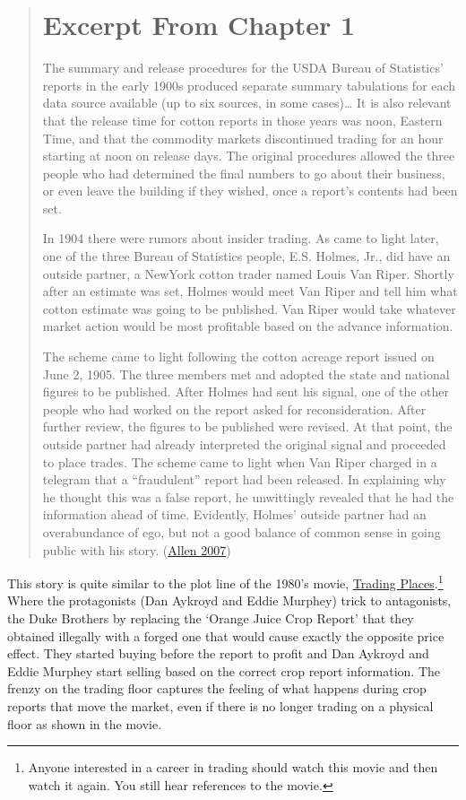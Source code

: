 \documentclass[
]{book}
\begin{document}
\begin{quote}
\hypertarget{excerpt-from-chapter-1}{%
\section{Excerpt From Chapter 1}\label{excerpt-from-chapter-1}}

The summary and release procedures for the USDA Bureau of Statistics' reports in the early 1900s produced separate summary tabulations for each data source available (up to six sources, in some cases)\ldots{} It is also relevant that the release time for cotton reports in those years was noon, Eastern Time, and that the commodity markets discontinued trading for an hour starting at noon on release days. The original procedures allowed the three people who had determined the final numbers to go about their business, or even leave the building if they wished, once a report's contents had been set.

In 1904 there were rumors about insider trading. As came to light later, one of the three Bureau of Statistics people, E.S. Holmes, Jr., did have an outside partner, a NewYork cotton trader named Louis Van Riper. Shortly after an estimate was set, Holmes would meet Van Riper and tell him what cotton estimate was going to be published. Van Riper would take whatever market action would be most profitable based on the advance information.

The scheme came to light following the cotton acreage report issued on June 2, 1905. The three members met and adopted the state and national figures to be published. After Holmes had sent his signal, one of the other people who had worked on the report asked for reconsideration. After further review, the figures to be published were revised. At that point, the outside partner had already interpreted the original signal and proceeded to place trades. The scheme came to light when Van Riper charged in a telegram that a ``fraudulent'' report had been released. In explaining why he thought this was a false report, he unwittingly revealed that he had the information ahead of time. Evidently, Holmes' outside partner had an overabundance of ego, but not a good balance of common sense in going public with his story. (\protect\hyperlink{ref-history2007Nass}{Allen 2007})
\end{quote}

This story is quite similar to the plot line of the 1980's movie, \href{http://www.imdb.com/title/tt0086465/}{Trading Places}.\footnote{Anyone interested in a career in trading should watch this movie and then watch it again. You still hear references to the movie.} Where the protagonists (Dan Aykroyd and Eddie Murphey) trick to antagonists, the Duke Brothers by replacing the `Orange Juice Crop Report' that they obtained illegally with a forged one that would cause exactly the opposite price effect. They started buying before the report to profit and Dan Aykroyd and Eddie Murphey start selling based on the correct crop report information. The frenzy on the trading floor captures the feeling of what happens during crop reports that move the market, even if there is no longer trading on a physical floor as shown in the movie.
\end{document}
